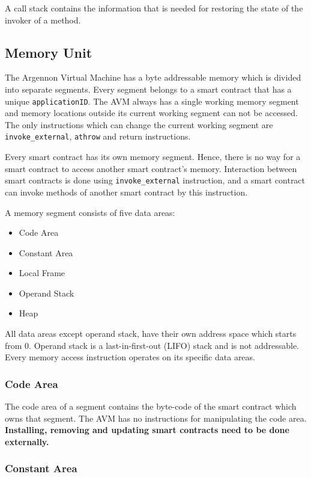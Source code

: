 \documentclass[a4paper]{report}
\begin{document}
    A call stack contains the information that is needed for restoring the state of the invoker of a method.

    \subsection{Memory Unit}\label{subsec:memory-unit}

    The Argennon Virtual Machine has a byte addressable memory which is divided into separate segments. Every segment
    belongs to a smart contract that has a unique \texttt{applicationID}. The AVM always has a single working memory
    segment and memory locations outside its current working segment can not be accessed. The only instructions which
    can change the current working segment are \texttt{invoke\_external}, \texttt{athrow} and return instructions.

    Every smart contract has its own memory segment. Hence, there is no way for a smart contract to access another
    smart contract's memory. Interaction between smart contracts is done using \texttt{invoke\_external} instruction,
    and a smart contract can invoke methods of another smart contract by this instruction.

    A memory segment consists of five data areas:
    \begin{itemize}
        \item Code Area
        \item Constant Area
        \item Local Frame
        \item Operand Stack
        \item Heap
    \end{itemize}
    All data areas except operand stack, have their own address space which starts from 0. Operand stack is a
    last-in-first-out (LIFO) stack and is not addressable. Every memory access instruction operates on its specific
    data areas.

    \subsubsection{Code Area}

    The code area of a segment contains the byte-code of the smart contract which owns that segment. The AVM has no
    instructions for manipulating the code area. \textbf{Installing, removing and updating smart contracts need to
    be done externally.}

    \subsubsection{Constant Area}
\end{document}
